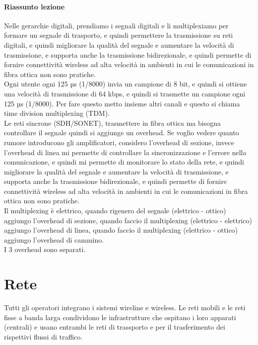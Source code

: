\paragraph{Riassunto lezione}
Nelle gerarchie digitali, prendiamo i segnali digitali e li multiplexiamo per formare un segnale di trasporto, e quindi permettere la trasmissione su reti digitali, e quindi migliorare la qualità del segnale e aumentare la velocità di trasmissione, e supporta anche la trasmissione bidirezionale, e quindi permette di fornire connettività wireless ad alta velocità in ambienti in cui le comunicazioni in fibra ottica non sono pratiche.\\

Ogni utente ogni 125 µs (1/8000) invia un campione di 8 bit, e quindi si ottiene una velocità di trasmissione di 64 kbps, e quindi si trasmette un campione ogni 125 µs (1/8000). Per fare questo metto insieme altri canali e questo si chiama time division multiplexing (TDM).\\

Le reti sincrone (SDH/SONET), trasmettere in fibra ottica ma bisogna controllare il segnale quindi si aggiunge un overhead. Se voglio vedere quanto rumore introducono gli amplificatori, considero l'overhead di sezione, invece l'overhead di linea mi permette di controllare la sincronizzazione e l'errore nella comunicazione, e quindi mi permette di monitorare lo stato della rete, e quindi migliorare la qualità del segnale e aumentare la velocità di trasmissione, e supporta anche la trasmissione bidirezionale, e quindi permette di fornire connettività wireless ad alta velocità in ambienti in cui le comunicazioni in fibra ottica non sono pratiche.\\

Il multiplexing è elettrico, quando rigenero del segnale (elettrico - ottico) aggiungo l'overhead di sezione, quando faccio il multiplexing (elettrico - elettrico) aggiungo l'overhead di linea, quando faccio il multiplexing (elettrico - ottico) aggiungo l'overhead di cammino.\\

I 3 overhead sono separati. 

\section{Rete}
Tutti gli operatori integrano i sistemi wireline e wireless. Le reti mobili e le reti fisse a banda larga condividono le infrastrutture che ospitano i loro apparati (centrali) e usano entrambi le reti di trassporto e per il trasferimento dei rispettivi flussi di traffico.\\

